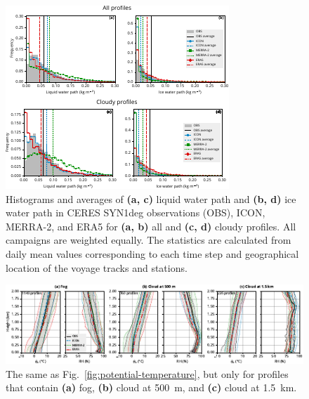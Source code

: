 \documentclass[draft,jgrga]{agutexSI2019}
\begin{document}
\begin{figure}[p!]
\includegraphics[width=\textwidth]{img/stats_hist_si.pdf}
\caption{
Histograms and averages of \textbf{(a, c)} liquid water path and \textbf{(b, d)} ice water path in CERES SYN1deg observations (OBS), ICON, MERRA-2, and ERA5 for \textbf{(a, b)} all and \textbf{(c, d)} cloudy profiles. All campaigns are weighted equally. The statistics are calculated from daily mean values corresponding to each time step and geographical location of the voyage tracks and stations.
}
\label{fig:stats-hist-si}
\end{figure}

\begin{figure}[t]
\centerline{
\includegraphics[width=1.2\textwidth]{img/rs_thetav_hur_cloud.pdf}
}
\caption{
The same as Fig.~\ref{fig:potential-temperature}, but only for profiles that contain \textbf{(a)} fog, \textbf{(b)} cloud at 500~m, and \textbf{(c)} cloud at 1.5~km.
}
\label{fig:rs-thetav-hur-cloud}
\end{figure}
\end{document}
